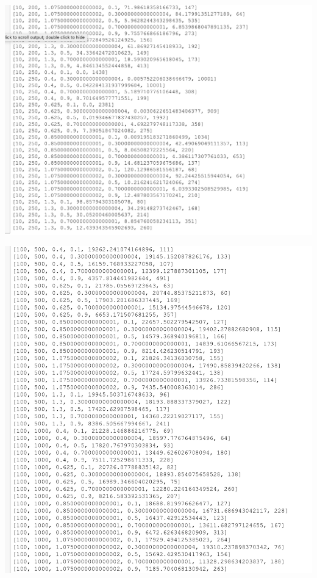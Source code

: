 \documentclass[10pt,a4paper]{article}
\begin{document}
	\includegraphics[width= \textwidth, keepaspectratio]{img/13}
	
	\includegraphics[width= \textwidth, keepaspectratio]{img/14}
	
\end{document}
